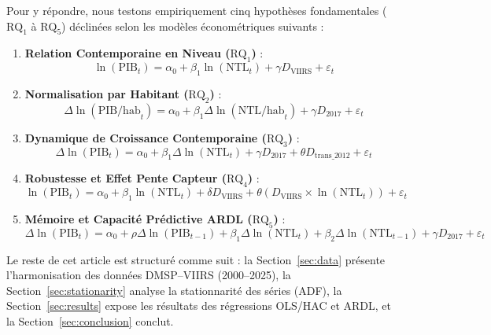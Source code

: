 Pour y répondre, nous testons empiriquement cinq hypothèses fondamentales ($\text{RQ}_1$ à $\text{RQ}_5$) déclinées selon les modèles économétriques suivants :

\begin{enumerate}
    \item \textbf{Relation Contemporaine en Niveau ($\text{RQ}_1$)} :
    \begin{equation}
        \ln(\text{PIB}_t) = \alpha_0 + \beta_1 \ln(\text{NTL}_t) + \gamma D_{\text{VIIRS}} + \varepsilon_t
    \end{equation}
    \item \textbf{Normalisation par Habitant ($\text{RQ}_2$)} :
    \begin{equation}
        \Delta \ln(\text{PIB/hab}_t) = \alpha_0 + \beta_1 \Delta \ln(\text{NTL/hab}_t) + \gamma D_{2017} + \varepsilon_t
    \end{equation}
    \item \textbf{Dynamique de Croissance Contemporaine ($\text{RQ}_3$)} :
    \begin{equation}
        \Delta \ln(\text{PIB}_t) = \alpha_0 + \beta_1 \Delta \ln(\text{NTL}_t) + \gamma D_{2017} + \theta D_{\text{trans\_2012}} + \varepsilon_t
    \end{equation}
    \item \textbf{Robustesse et Effet Pente Capteur ($\text{RQ}_4$)} :
    \begin{equation}
        \ln(\text{PIB}_t) = \alpha_0 + \beta_1 \ln(\text{NTL}_t) + \delta D_{\text{VIIRS}} + \theta (D_{\text{VIIRS}} \times \ln(\text{NTL}_t)) + \varepsilon_t
    \end{equation}
    \item \textbf{Mémoire et Capacité Prédictive ARDL ($\text{RQ}_5$)} :
    \begin{equation}
        \Delta \ln(\text{PIB}_t) = \alpha_0 + \rho \Delta \ln(\text{PIB}_{t-1}) + \beta_1 \Delta \ln(\text{NTL}_t) + \beta_2 \Delta \ln(\text{NTL}_{t-1}) + \gamma D_{2017} + \varepsilon_t
    \end{equation}
\end{enumerate}

Le reste de cet article est structuré comme suit : la Section~\ref{sec:data} présente l'harmonisation des données DMSP--VIIRS (2000--2025), la Section~\ref{sec:stationarity} analyse la stationnarité des séries (ADF), la Section~\ref{sec:results} expose les résultats des régressions OLS/HAC et ARDL, et la Section~\ref{sec:conclusion} conclut.

